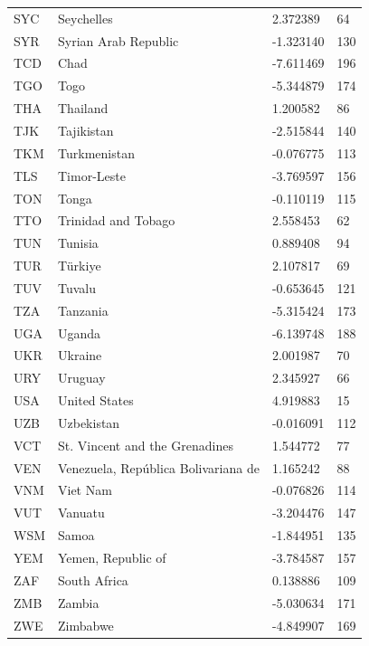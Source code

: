 \begin{tabular}{llll}
SYC & Seychelles & 2.372389 & 64 \\
SYR & Syrian Arab Republic & -1.323140 & 130 \\
TCD & Chad & -7.611469 & 196 \\
TGO & Togo & -5.344879 & 174 \\
THA & Thailand & 1.200582 & 86 \\
TJK & Tajikistan & -2.515844 & 140 \\
TKM & Turkmenistan & -0.076775 & 113 \\
TLS & Timor-Leste & -3.769597 & 156 \\
TON & Tonga & -0.110119 & 115 \\
TTO & Trinidad and Tobago & 2.558453 & 62 \\
TUN & Tunisia & 0.889408 & 94 \\
TUR & Türkiye & 2.107817 & 69 \\
TUV & Tuvalu & -0.653645 & 121 \\
TZA & Tanzania & -5.315424 & 173 \\
UGA & Uganda & -6.139748 & 188 \\
UKR & Ukraine & 2.001987 & 70 \\
URY & Uruguay & 2.345927 & 66 \\
USA & United States & 4.919883 & 15 \\
UZB & Uzbekistan & -0.016091 & 112 \\
VCT & St. Vincent and the Grenadines & 1.544772 & 77 \\
VEN & Venezuela, República Bolivariana de & 1.165242 & 88 \\
VNM & Viet Nam & -0.076826 & 114 \\
VUT & Vanuatu & -3.204476 & 147 \\
WSM & Samoa & -1.844951 & 135 \\
YEM & Yemen, Republic of & -3.784587 & 157 \\
ZAF & South Africa & 0.138886 & 109 \\
ZMB & Zambia & -5.030634 & 171 \\
ZWE & Zimbabwe & -4.849907 & 169 \\
\hline
\end{tabular}
